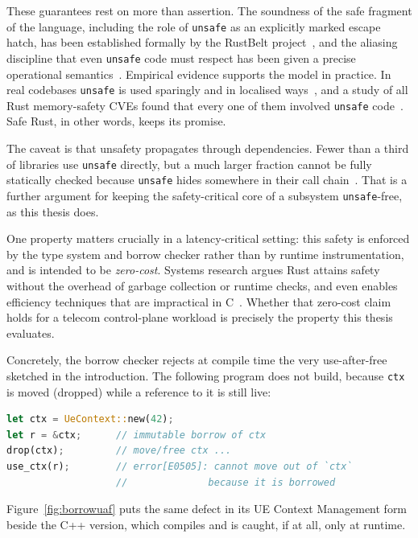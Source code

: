 \documentclass[english,twoside,openright,a4paper,censored,csm,software-track-2020]{HYthesisML}
\begin{document}
These guarantees rest on more than assertion. The soundness of the safe fragment of the
language, including the role of \texttt{unsafe} as an explicitly marked escape hatch, has
been established formally by the RustBelt project~\cite{jung2018rustbelt}, and the aliasing
discipline that even \texttt{unsafe} code must respect has been given a precise operational
semantics~\cite{jung2020stacked}. Empirical evidence supports the model in practice. In real
codebases \texttt{unsafe} is used sparingly and in localised
ways~\cite{astrauskas2020unsafe,qin2020rust}, and a study of all Rust memory-safety CVEs found
that every one of them involved \texttt{unsafe} code~\cite{xu2021rustcve}. Safe Rust, in other
words, keeps its promise.

The caveat is that unsafety propagates through dependencies. Fewer than a third of libraries
use \texttt{unsafe} directly, but a much larger fraction cannot be fully statically checked
because \texttt{unsafe} hides somewhere in their call chain~\cite{evans2020rust}. That is a
further argument for keeping the safety-critical core of a subsystem \texttt{unsafe}-free, as
this thesis does.

One property matters crucially in a latency-critical setting: this safety is enforced by the
type system and borrow checker rather than by runtime instrumentation, and is intended to be
\emph{zero-cost}. Systems research argues Rust attains safety without the overhead of garbage
collection or runtime checks, and even enables efficiency techniques that are impractical in
C~\cite{balasubramanian2017rust}. Whether that zero-cost claim holds for a telecom
control-plane workload is precisely the property this thesis evaluates.

Concretely, the borrow checker rejects at compile time the very use-after-free sketched in the
introduction. The following program does not build, because \texttt{ctx} is moved (dropped)
while a reference to it is still live:

\begin{lstlisting}[language=Rust]
let ctx = UeContext::new(42);
let r = &ctx;      // immutable borrow of ctx
drop(ctx);         // move/free ctx ...
use_ctx(r);        // error[E0505]: cannot move out of `ctx`
                   //              because it is borrowed
\end{lstlisting}

\noindent Figure~\ref{fig:borrowuaf} puts the same defect in its UE Context Management form
beside the C++ version, which compiles and is caught, if at all, only at runtime.
\end{document}

